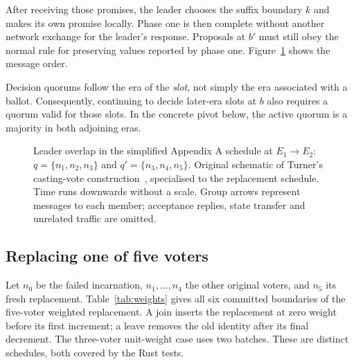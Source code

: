 \documentclass[10pt,journal,letterpaper]{IEEEtran}
\begin{document}
After receiving those promises, the leader chooses the suffix boundary $k$ and makes its own promise locally. Phase one is then complete without another network exchange for the leader's response. Proposals at $b'$ must still obey the normal rule for preserving values reported by phase one. Figure~\ref{fig:overlap} shows the message order.

Decision quorums follow the era of the \emph{slot}, not simply the era associated with a ballot. Consequently, continuing to decide later-era slots at $b$ also requires a quorum valid for those slots. In the concrete pivot below, the active quorum is a majority in both adjoining eras.

\begin{figure}[t]
\centering
{}
\caption{Leader overlap in the simplified Appendix A schedule at $E_1\rightarrow E_2$: $q=\{n_1,n_2,n_3\}$ and $q'=\{n_3,n_4,n_5\}$. Original schematic of Turner's casting-vote construction~\cite{turner}, specialised to the replacement schedule. Time runs downwards without a scale. Group arrows represent messages to each member; acceptance replies, state transfer and unrelated traffic are omitted.}
\label{fig:overlap}
\end{figure}

\subsection{Replacing one of five voters}
Let $n_0$ be the failed incarnation, $n_1,\ldots,n_4$ the other original voters, and $n_5$ its fresh replacement. Table~\ref{tab:weights} gives all six committed boundaries of the five-voter weighted replacement. A join inserts the replacement at zero weight before its first increment; a leave removes the old identity after its final decrement. The three-voter unit-weight case uses two batches. These are distinct schedules, both covered by the Rust tests.
\end{document}
